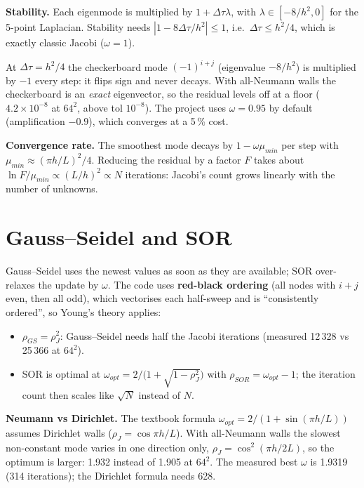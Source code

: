 \textbf{Stability.} Each eigenmode is multiplied by $1+\Delta\tau\lambda$, with $\lambda\in[-8/h^2,0]$ for the 5-point Laplacian. Stability needs $|1-8\Delta\tau/h^2|\le1$, i.e.\ $\Delta\tau\le h^2/4$, which is exactly classic Jacobi ($\omega=1$).

\begin{pitfall}
At $\Delta\tau=h^2/4$ the checkerboard mode $(-1)^{i+j}$ (eigenvalue $-8/h^2$) is multiplied by $-1$ every step: it flips sign and never decays. With all-Neumann walls the checkerboard is an \emph{exact} eigenvector, so the residual levels off at a floor ($4.2\times10^{-8}$ at $64^2$, above tol $10^{-8}$). The project uses $\omega=0.95$ by default (amplification $-0.9$), which converges at a 5\,\% cost.
\end{pitfall}

\textbf{Convergence rate.} The smoothest mode decays by $1-\omega\mu_{min}$ per step with $\mu_{min}\approx(\pi h/L)^2/4$. Reducing the residual by a factor $F$ takes about $\ln F/\mu_{min}\propto(L/h)^2\propto N$ iterations: Jacobi's count grows linearly with the number of unknowns.

\section{Gauss--Seidel and SOR}
Gauss--Seidel uses the newest values as soon as they are available; SOR over-relaxes the update by $\omega$. The code uses \textbf{red-black ordering} (all nodes with $i+j$ even, then all odd), which vectorises each half-sweep and is ``consistently ordered'', so Young's theory applies:
\begin{itemize}
\item $\rho_{GS}=\rho_J^2$: Gauss--Seidel needs half the Jacobi iterations (measured 12\,328 vs 25\,366 at $64^2$).
\item SOR is optimal at $\omega_{opt}=2/\big(1+\sqrt{1-\rho_J^2}\big)$ with $\rho_{SOR}=\omega_{opt}-1$; the iteration count then scales like $\sqrt N$ instead of $N$.
\end{itemize}
\textbf{Neumann vs Dirichlet.} The textbook formula $\omega_{opt}=2/(1+\sin(\pi h/L))$ assumes Dirichlet walls ($\rho_J=\cos\pi h/L$). With all-Neumann walls the slowest non-constant mode varies in one direction only, $\rho_J=\cos^2(\pi h/2L)$, so the optimum is larger: 1.932 instead of 1.905 at $64^2$. The measured best $\omega$ is 1.9319 (314 iterations); the Dirichlet formula needs 628.

